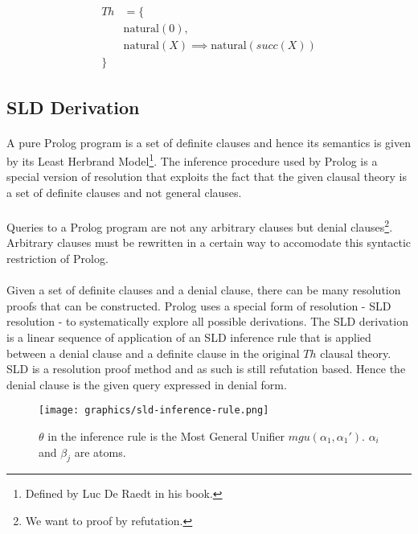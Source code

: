 \documentclass{article}
\theoremstyle{plain}
\theoremstyle{definition}
\begin{document}
\begin{multicols}{2}
\begin{align*}
Th &= \{\\
	&\text{natural}(0),\\
	&\text{natural}(X) \implies \text{natural}(succ(X))\\
	\}&
\end{align*}

\subsection{SLD Derivation}
\paragraph{} A pure Prolog program is a set of definite clauses and hence its semantics is given by its Least Herbrand Model\footnote{Defined by Luc De Raedt in his book.}. The inference procedure used by Prolog is a special version of resolution that exploits the fact that the given clausal theory is a set of definite clauses and not general clauses. 

\paragraph{} Queries to a Prolog program are not any arbitrary clauses but denial clauses\footnote{We want to proof by refutation.}. Arbitrary clauses must be rewritten in a certain way to accomodate this syntactic restriction of Prolog. 

\paragraph{} Given a set of definite clauses and a denial clause, there can be many resolution proofs that can be constructed. Prolog uses a special form of resolution - SLD resolution - to systematically explore all possible derivations. The SLD derivation is a linear sequence of application of an SLD inference rule that is applied between a denial clause and a definite clause in the original $Th$ clausal theory. SLD is a resolution proof method and as such is still refutation based. Hence the denial clause is the given query expressed in denial form. 

\begin{figure}[H]
\centering
\texttt{[image: graphics/sld-inference-rule.png]}
\caption{$\theta$ in the inference rule is the Most General Unifier $mgu(\alpha_1, \alpha_1')$. $\alpha_i$ and $\beta_j$ are atoms.}
\end{figure}


\end{multicols}
\end{document}
